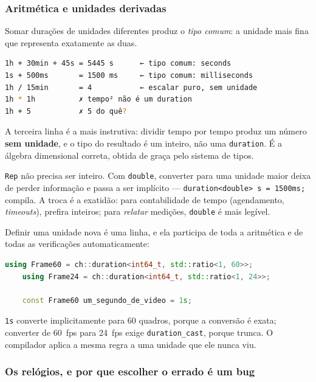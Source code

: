 \subsubsection{Aritmética e unidades derivadas}

Somar durações de unidades diferentes produz o \emph{tipo comum}: a unidade mais
fina que representa exatamente as duas.

\begin{lstlisting}[style=bt, language=bash,
    caption={Saída de \texttt{src/chrono/}: a álgebra das durações.}]
1h + 30min + 45s = 5445 s      ← tipo comum: seconds
1s + 500ms       = 1500 ms     ← tipo comum: milliseconds
1h / 15min       = 4           ← escalar puro, sem unidade
1h * 1h          ✗ tempo² não é um duration
1h + 5           ✗ 5 do quê?
\end{lstlisting}

A terceira linha é a mais instrutiva: dividir tempo por tempo produz um número
\textbf{sem unidade}, e o tipo do resultado é um inteiro, não uma
\texttt{duration}. É a álgebra dimensional correta, obtida de graça pelo sistema
de tipos.

\texttt{Rep} não precisa ser inteiro. Com \texttt{double}, converter para uma
unidade maior deixa de perder informação e passa a ser implícito ---
\texttt{duration<double> s = 1500ms;} compila. A troca é a exatidão: para
contabilidade de tempo (agendamento, \emph{timeouts}), prefira inteiros; para
\emph{relatar} medições, \texttt{double} é mais legível.

Definir uma unidade nova é uma linha, e ela participa de toda a aritmética e de
todas as verificações automaticamente:

\begin{lstlisting}[style=bt, language=C++,
    caption={Transcrição de \texttt{src/chrono/demo\_duration.hpp}: quadros de
             vídeo como unidade de tempo.}]
    using Frame60 = ch::duration<int64_t, std::ratio<1, 60>>;
    using Frame24 = ch::duration<int64_t, std::ratio<1, 24>>;

    const Frame60 um_segundo_de_video = 1s;
\end{lstlisting}

\texttt{1s} converte implicitamente para 60 quadros, porque a conversão é
exata; converter de 60~fps para 24~fps exige \texttt{duration\_cast}, porque
trunca. O compilador aplica a mesma regra a uma unidade que ele nunca viu.

\subsubsection{Os relógios, e por que escolher o errado é um bug}
\label{sec:clocks}

